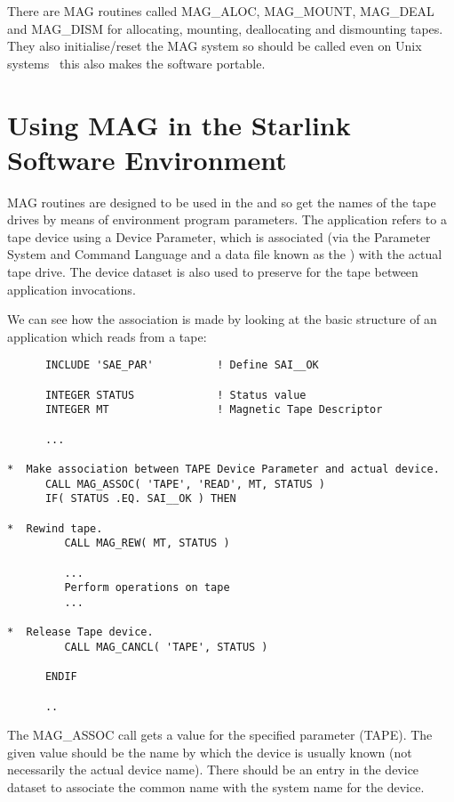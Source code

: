 There are MAG routines called MAG\_ALOC, MAG\_MOUNT, MAG\_DEAL and MAG\_DISM
for allocating, mounting, deallocating and dismounting tapes. They also
initialise/reset the MAG system so should be called even on Unix systems
\dash\ this also makes the software portable.

\section{Using MAG in the Starlink Software Environment}
MAG routines are designed to be used in the 
and so get the names of the tape drives by means of environment program 
parameters. The application refers to a tape device using a Device Parameter, 
which is associated (via the Parameter System and Command Language and a data
file known as the 
) with the actual tape drive. 
The device dataset is also used to preserve 
for the tape between application
invocations.

We can see how the association is made by looking at the basic structure of 
an application which reads from a tape: 

\small
\begin{verbatim}
      INCLUDE 'SAE_PAR'          ! Define SAI__OK

      INTEGER STATUS             ! Status value
      INTEGER MT                 ! Magnetic Tape Descriptor

      ...

*  Make association between TAPE Device Parameter and actual device.
      CALL MAG_ASSOC( 'TAPE', 'READ', MT, STATUS )
      IF( STATUS .EQ. SAI__OK ) THEN

*  Rewind tape.
         CALL MAG_REW( MT, STATUS )

         ...
         Perform operations on tape
         ...

*  Release Tape device.
         CALL MAG_CANCL( 'TAPE', STATUS )

      ENDIF

      ..
\end{verbatim}
\normalsize

The MAG\_ASSOC call gets a value for the specified parameter (TAPE).
The given value should be the name by which the device is usually known
(not necessarily the actual device name). There should be an entry in the
device dataset to associate the common name with the system name for the
device.

